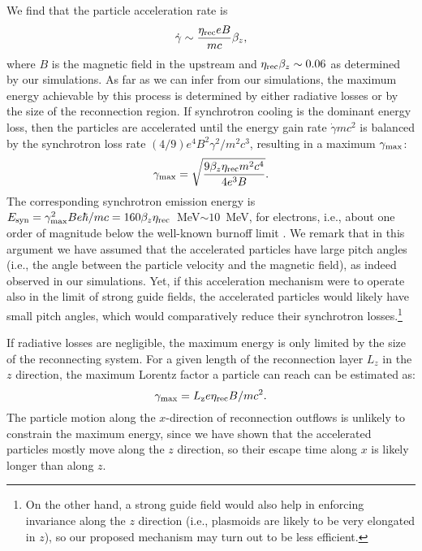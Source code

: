 \documentclass[twocolumn,twocolappendix]{aastex63}
\begin{document}
We find that the particle acceleration rate is
\begin{equation}
    \dot{\gamma} \sim \frac{\eta_{\rm rec} eB}{mc} \beta_z,
\end{equation}
where $B$ is the magnetic field in the upstream and $\eta_{\rm rec}\beta_z\sim 0.06$ as determined by our simulations. As far as we can infer from our simulations, the maximum 
energy achievable by this process is determined by either radiative losses or by the size of the reconnection region. If synchrotron cooling
is the dominant energy loss, then the particles are accelerated until the energy gain rate $\dot{\gamma} m c^2$ is balanced by the synchrotron loss rate
$(4/9)e^4B^2\gamma^2/m^2c^3$, resulting in a maximum $\gamma_{\rm max}$:
\begin{equation}\label{eq:gmax_red}
\gamma_{\rm max}=\sqrt{\frac{9\beta_z\eta_{\rm rec}m^2c^4}{4e^3B}}.
\end{equation}
The corresponding synchrotron emission energy is $E_{\rm syn}=\gamma_{\rm max}^2Be\hbar/mc=160\beta_z\eta_{\rm rec}$~MeV$\sim 10$~MeV, for electrons, i.e., about one order of magnitude below the well-known burnoff limit \citep{dejager_harding_92}. We remark that in this argument we have assumed that the accelerated particles have large pitch angles (i.e., the angle between the particle velocity and the magnetic field), as indeed observed in our simulations. Yet, if this acceleration mechanism were to operate also in the limit of strong guide fields, the accelerated particles would likely have small pitch angles, which would comparatively reduce their synchrotron  losses.\footnote{On the other hand, a strong guide field would also help in enforcing invariance along the $z$ direction (i.e., plasmoids are likely to be very elongated in $z$), so our proposed mechanism may turn out to be less efficient.} 

If radiative losses are negligible, the maximum energy is only limited by the size of the reconnecting system.
For a given length of the reconnection layer $L_z$ in the $z$ direction, the maximum Lorentz factor a particle can reach can be estimated as: 
\begin{equation}\label{eq:gmax}
    \gamma_{\rm max} = L_{\rm z}e\eta_{\rm rec}B/mc^2.
\end{equation}
The particle motion along the $x$-direction of reconnection outflows is unlikely to constrain the maximum energy, since we have shown that the accelerated particles mostly move along the $z$ direction, so their escape time along $x$ is likely longer than along $z$.
\end{document}

